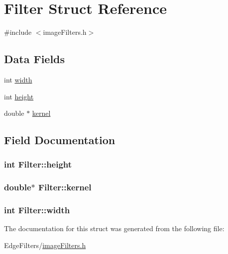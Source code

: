 \hypertarget{struct_filter}{}\section{Filter Struct Reference}
\label{struct_filter}


{\ttfamily \#include $<$image\+Filters.\+h$>$}

\subsection*{Data Fields}
\begin{DoxyCompactItemize}
\item 
int \hyperlink{struct_filter_a4cc9de0bbbb278889fec030c16078ba3}{width}
\item 
int \hyperlink{struct_filter_a84dc0a1a8114ae3bb64a7c4e07626b22}{height}
\item 
double $\ast$ \hyperlink{struct_filter_a3a4c7f287be386887879bed75f9ccad2}{kernel}
\end{DoxyCompactItemize}


\subsection{Field Documentation}
\hypertarget{struct_filter_a84dc0a1a8114ae3bb64a7c4e07626b22}{}
\subsubsection[{height}]{\setlength{\rightskip}{0pt plus 5cm}int Filter\+::height}\label{struct_filter_a84dc0a1a8114ae3bb64a7c4e07626b22}
\hypertarget{struct_filter_a3a4c7f287be386887879bed75f9ccad2}{}
\subsubsection[{kernel}]{\setlength{\rightskip}{0pt plus 5cm}double$\ast$ Filter\+::kernel}\label{struct_filter_a3a4c7f287be386887879bed75f9ccad2}
\hypertarget{struct_filter_a4cc9de0bbbb278889fec030c16078ba3}{}
\subsubsection[{width}]{\setlength{\rightskip}{0pt plus 5cm}int Filter\+::width}\label{struct_filter_a4cc9de0bbbb278889fec030c16078ba3}


The documentation for this struct was generated from the following file\+:\begin{DoxyCompactItemize}
\item 
Edge\+Filters/\hyperlink{image_filters_8h}{image\+Filters.\+h}\end{DoxyCompactItemize}
